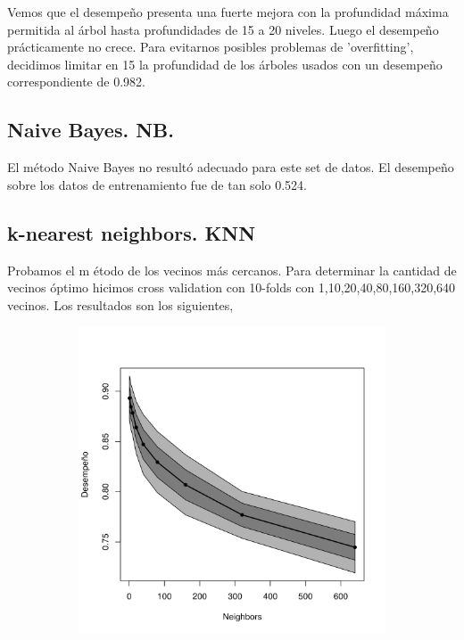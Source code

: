 \documentclass[a4paper,10pt]{article}
\begin{document}
Vemos que el desempeño presenta una fuerte mejora con la profundidad máxima 
permitida al árbol hasta profundidades de 15 a 20 niveles. Luego el desempeño 
prácticamente no crece. Para evitarnos posibles problemas de 'overfitting', 
decidimos limitar en 15 la profundidad de los árboles usados con un desempeño 
correspondiente de 0.982.

\subsection{Naive Bayes. NB.}

El m\'etodo Naive Bayes no result\'o adecuado para este set de datos. El desempeño 
sobre los datos de entrenamiento fue de tan solo 0.524. 




\subsection{k-nearest neighbors. KNN}

Probamos el m \'etodo de los vecinos m\'as cercanos. Para determinar la cantidad de vecinos \'optimo hicimos cross validation con 10-folds con 1,10,20,40,80,160,320,640 vecinos. Los resultados son los siguientes, 

\begin{figure}[H]
  \centering
  \begin{subfigure}[b]{0.4\textwidth}
    \includegraphics[width=\textwidth]{../imagenes/knn-n_neighbors}
     \caption{}
  \end{subfigure}
  \label{fig:knn-n_neighbors}
\end{figure}
\end{document}
